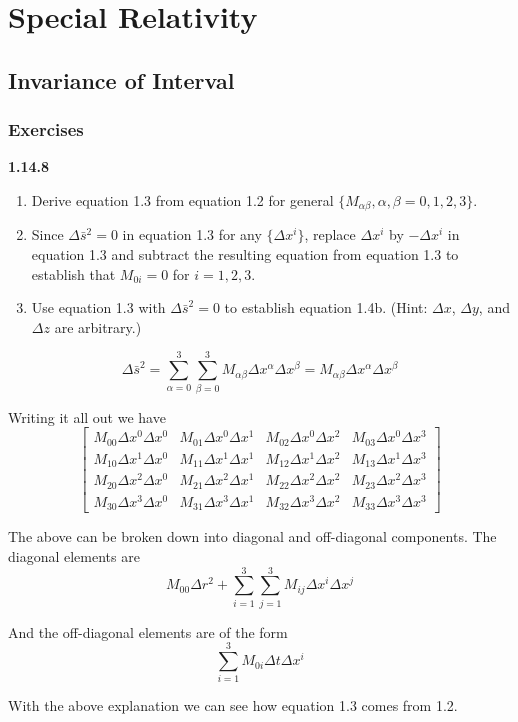 \section{Special Relativity}

\subsection{Invariance of Interval}

\subsubsection{Exercises}

\textbf{1.14.8}
\begin{enumerate}
\item Derive equation 1.3 from equation 1.2 for general $\{ M_{\alpha\beta}, \alpha,\beta=0,1,2,3 \}$.
\item Since $\Delta \bar{s}^2 = 0$ in equation 1.3 for any $\{\Delta x^i \}$, replace $\Delta x^i$
    by $-\Delta x^i$ in equation 1.3 and subtract the resulting equation from equation 1.3 to establish that
    $M_{0i} = 0$ for $i=1,2,3$.
\item Use equation 1.3 with $\Delta \bar{s}^2 = 0$ to establish equation 1.4b. (Hint: $\Delta x$,
    $\Delta y$, and $\Delta z$ are arbitrary.)
\end{enumerate}

$$
\Delta \bar{s}^2 = \sum^{3}_{\alpha =0} \sum^{3}_{\beta = 0} M_{\alpha \beta} \Delta x^\alpha \Delta x^\beta
= M_{\alpha \beta} \Delta x^\alpha \Delta x^\beta
$$

Writing it all out we have
$$
\begin{bmatrix}
M_{00} \Delta x^0 \Delta x^0 & M_{01} \Delta x^0 \Delta x^1 & M_{02} \Delta x^0 \Delta x^2 & M_{03} \Delta x^0 \Delta x^3 \\
M_{10} \Delta x^1 \Delta x^0 & M_{11} \Delta x^1 \Delta x^1 & M_{12} \Delta x^1 \Delta x^2 & M_{13} \Delta x^1 \Delta x^3 \\
M_{20} \Delta x^2 \Delta x^0 & M_{21} \Delta x^2 \Delta x^1 & M_{22} \Delta x^2 \Delta x^2 & M_{23} \Delta x^2 \Delta x^3 \\
M_{30} \Delta x^3 \Delta x^0 & M_{31} \Delta x^3 \Delta x^1 & M_{32} \Delta x^3 \Delta x^2 & M_{33} \Delta x^3 \Delta x^3
\end{bmatrix}
$$

The above can be broken down into diagonal and off-diagonal components.
The diagonal elements are
$$
M_{00} \Delta r^2 + \sum^{3}_{i=1} \sum^{3}_{j=1} M_{ij} \Delta x^i \Delta x^j
$$

And the off-diagonal elements are of the form
$$
\sum^{3}_{i=1} M_{0i} \Delta t \Delta x^i
$$

With the above explanation we can see how equation 1.3 comes from 1.2.
